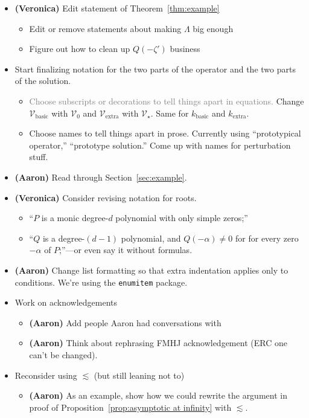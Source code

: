 \documentclass{article}
\theoremstyle{plain}
\newcommand{\volterra}{\mathcal{V}}
\newcommand{\hardpart}{\mathcal{V}_\text{basic}}
\newcommand{\softpart}{\mathcal{V}_\text{extra}}
\newcommand{\hardker}{k_\text{basic}}
\newcommand{\softker}{k_\text{extra}}
\newenvironment{brainstorm}{\color{violet}\begin{itemize}}{\end{itemize}\color{black}}
\begin{document}
\begin{brainstorm}
\begin{itemize}
    \color{gray}
    \item \textit{(Veronica)} Convert ``proof'' blocks to plain prose after main results. 
\end{itemize}
\color{gray}
\item \textbf{(Veronica)} Edit statement of Theorem~\ref{thm:example} 
\begin{itemize}
    \item Edit or remove statements about making $\Lambda$ big enough
    \item Figure out how to clean up $Q(-\zeta')$ business
\end{itemize}
\color{violet}
\item Start finalizing notation for the two parts of the operator and the two parts of the solution.
\begin{itemize}
    \item \textcolor{gray}{Choose subscripts or decorations to tell things apart in equations.} Change $\hardpart$ with $\volterra_0$ and $\softpart$ with $\volterra_\star$. Same for $\hardker$ and $\softker$. 
    \item Choose names to tell things apart in prose. Currently using ``prototypical operator,'' ``prototype solution.'' Come up with names for perturbation stuff.
\end{itemize}
\item \textbf{(Aaron)} Read through Section~\ref{sec:example}.
\color{gray}
\item \textbf{(Veronica)} Consider revising notation for roots. 
\begin{itemize}
\item ``$P$ is a monic degree-$d$ polynomial with only simple zeros;''
\item ``$Q$ is a degree-$(d-1)$ polynomial, and $Q(-\alpha) \neq 0$ for for every zero $-\alpha$ of $P$;''---or even say it without formulas.
\end{itemize}
\color{violet}
\item \textbf{(Aaron)} Change list formatting so that extra indentation applies only to conditions. We're using the \texttt{enumitem} package.
\item Work on acknowledgements
\begin{itemize}
\item \textbf{(Aaron)} Add people Aaron had conversations with
\item \textbf{(Aaron)} Think about rephrasing FMHJ acknowledgement (ERC one can't be changed).
\end{itemize}
\item Reconsider using $\lesssim$ (but still leaning not to)
\begin{itemize}
    \item \textbf{(Aaron)} As an example, show how we could rewrite the argument in proof of Proposition~\ref{prop:asymptotic at infinity} with $\lesssim$.
\end{itemize}
\end{brainstorm}
\end{document}
